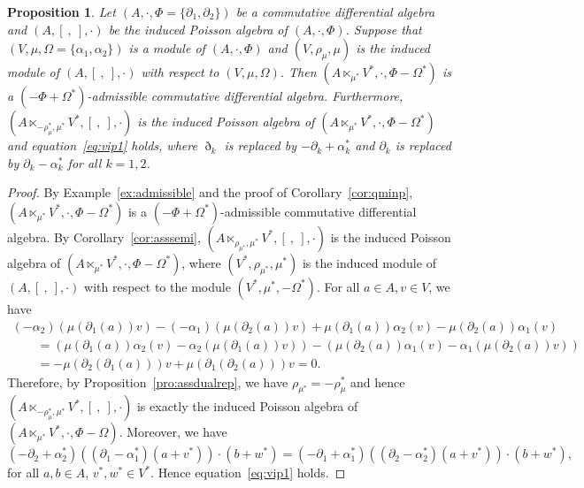 \documentclass[pdftex]{sigma}
\numberwithin{equation}{section}
\newtheorem{Proposition}[Theorem]{Proposition}
{ \theoremstyle{definition}
	\newtheorem{Definition}[Theorem]{Definition}
	\newtheorem{Note}[Theorem]{Note}
	\newtheorem{Example}[Theorem]{Example}
	\newtheorem{Remark}[Theorem]{Remark} }
\begin{document}
\begin{Proposition}\label{pro:cond}
 Let $(A, \cdot, \Phi = \{\partial_1,\partial_2\})$ be a commutative differential algebra and
 $(A, [\ ,\ ], \cdot)$
 be the induced Poisson algebra of $(A, \cdot, \Phi)$.
 Suppose that $(V, \mu, \Omega = \{\alpha_1, \alpha_2\})$ is a module of $(A, \cdot, \Phi)$ and
 $(V, \rho_\mu, \mu)$ is the induced module of $(A, [\ ,\ ], \cdot)$ with respect to $(V, \mu, \Omega)$.
 Then $(A \ltimes_{\mu^*} V^*, \cdot, \Phi - \Omega^*)$ is a $(-\Phi + \Omega^*)$-admissible commutative differential algebra.
 Furthermore, $(A \ltimes_{-\rho_\mu^*, \mu^*} V^*, [\ ,\ ], \cdot)$ is the induced Poisson algebra of $(A \ltimes_{\mu^*} V^*, \cdot, \Phi - \Omega^*)$
 and equation~\eqref{eq:vip1} holds, where $\eth_k$ is replaced by $-\partial_k + \alpha_k^*$ and $\partial_k$ is replaced by $\partial_k - \alpha_k^*$ for all $k=1, 2$.
\end{Proposition}
\begin{proof}
By Example~\ref{ex:admissible} and the proof of Corollary~\ref{cor:qminp},
$(A \ltimes_{\mu^*} V^*, \cdot, \Phi - \Omega^*)$ is a $(-\Phi + \Omega^*)$-admissible commutative differential algebra.
By Corollary~\ref{cor:asssemi}, $(A \ltimes_{\rho_{\mu^*}, \mu^*} V^*, [\ ,\ ], \cdot)$ is the induced Poisson algebra of $(A \ltimes_{\mu^*} V^*, \cdot,
\Phi - \Omega^*)$,
where $(V^*, \rho_{\mu^*}, \mu^*)$ is the induced module of $(A, [\ ,\ ], \cdot)$ with respect to the module $(V^*, \mu^{*}, -\Omega^*)$.
For all $a \in A, v \in V$, we have
\begin{gather*}
 (-\alpha_2)(\mu(\partial_1(a))v) - (-\alpha_1)(\mu(\partial_2(a))v) + \mu(\partial_1(a))\alpha_2(v) - \mu(\partial_2(a))\alpha_1(v) \\
\qquad{} = (\mu(\partial_1(a))\alpha_2(v) - \alpha_2(\mu(\partial_1(a))v) ) - (\mu(\partial_2(a))\alpha_1(v) - \alpha_1(\mu(\partial_2(a))v) ) \\
 \qquad{} = - \mu(\partial_2(\partial_1(a)))v + \mu(\partial_1(\partial_2(a)))v = 0.
\end{gather*}
Therefore, by Proposition~\ref{pro:assdualrep}, we have
$\rho_{\mu^*} = - \rho_{\mu}^*$
and hence $(A \ltimes_{-\rho_\mu^*, \mu^*} V^*, [\ ,\ ], \cdot)$ is exactly the
induced Poisson algebra of $(A \ltimes_{\mu^*} V^*, \cdot, \Phi - \Omega)$.
Moreover, we have
\begin{equation*}
 (-\partial_2+\alpha_2^*)((\partial_1-\alpha_1^*)(a+v^*)) \cdot (b+w^*) =
 (-\partial_1+\alpha_1^*)((\partial_2-\alpha_2^*)(a+v^*)) \cdot (b+w^*),
\end{equation*}
for all $a, b \in A$, $v^*, w^* \in V^*$. Hence equation~\eqref{eq:vip1} holds.
\end{proof}
\end{document}
